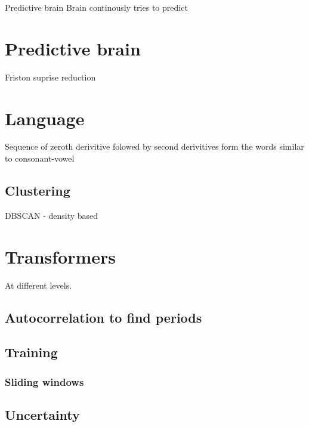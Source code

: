 \begin{frame}{Predictive brain}
    Brain continously tries to predict
    
    \section{Predictive brain}
        Friston suprise reduction
    \section{Language}
        Sequence of zeroth derivitive folowed by second derivitives form the words similar to consonant-vowel
        
        \subsection{Clustering}
            DBSCAN - density based
    
    
    \section{Transformers}
        At different levels. 
        \subsection{Autocorrelation to find periods}
        \subsection{Training}
            \subsubsection{Sliding windows}
        \subsection{Uncertainty}

\end{frame}